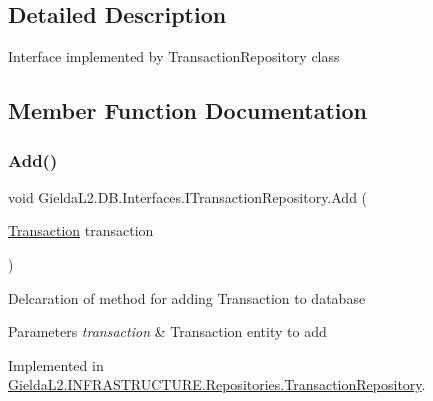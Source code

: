 \subsection{Detailed Description}
Interface implemented by Transaction\+Repository class 



\subsection{Member Function Documentation}
\mbox{\label{interface_gielda_l2_1_1_d_b_1_1_interfaces_1_1_i_transaction_repository_a3f4295d1d4898ed86d72734cc970cd90}} 
\subsubsection{\texorpdfstring{Add()}{Add()}}
{\footnotesize\ttfamily void Gielda\+L2.\+D\+B.\+Interfaces.\+I\+Transaction\+Repository.\+Add (\begin{DoxyParamCaption}\item[{\mbox{\hyperlink{class_gielda_l2_1_1_d_b_1_1_entities_1_1_transaction}{Transaction}}}]{transaction }\end{DoxyParamCaption})}



Delcaration of method for adding Transaction to database 


\begin{DoxyParams}{Parameters}
{\em transaction} & Transaction entity to add\\
\hline
\end{DoxyParams}


Implemented in \mbox{\hyperlink{class_gielda_l2_1_1_i_n_f_r_a_s_t_r_u_c_t_u_r_e_1_1_repositories_1_1_transaction_repository_a4ec5cb8eba918ee16d2b40644877609a}{Gielda\+L2.\+I\+N\+F\+R\+A\+S\+T\+R\+U\+C\+T\+U\+R\+E.\+Repositories.\+Transaction\+Repository}}.

\mbox{\label{interface_gielda_l2_1_1_d_b_1_1_interfaces_1_1_i_transaction_repository_a75aa347958df45ffbb7133fce8ba496f}} 

